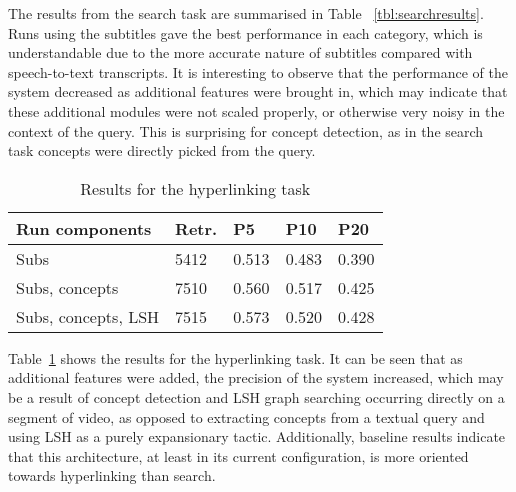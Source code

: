 \documentclass{../acm_proc_article-me11_tweaked}
\begin{document}
The results from the search task are summarised in Table~
\ref{tbl:searchresults}. Runs using the subtitles gave the best performance in 
each category, which is understandable due to the more accurate nature of 
subtitles compared with speech-to-text transcripts. It is interesting to 
observe that the performance of the system decreased as additional features 
were brought in, which may indicate that these additional modules were not 
scaled properly, or otherwise very noisy in the context of the query. This is 
surprising for concept detection, as in the search task concepts were directly 
picked from the query.

\begin{table}
\centering
\caption{Results for the hyperlinking task}
\label{tbl:hyperresults}
\begin{tabular}{|l|l|l|l|l|}
\hline
\textbf{Run components} & \textbf{Retr.} & \textbf{P5} & \textbf{P10} &
\textbf{P20} \\
\hline
Subs & 5412 & 0.513 & 0.483 & 0.390 \\
Subs, concepts & 7510 & 0.560 & 0.517 & 0.425 \\
Subs, concepts, LSH & 7515 & 0.573 & 0.520 & 0.428 \\
\hline
\end{tabular}
\end{table}

Table~\ref{tbl:hyperresults} shows the results for the hyperlinking 
task. It can be seen that as additional features were added, the 
precision of the system increased, which may be a result of concept detection 
and LSH graph searching occurring directly on a segment of video, as opposed to 
extracting concepts from a textual query and using LSH as a purely 
expansionary tactic. Additionally, baseline results indicate that this 
architecture, at least in its current configuration, is more oriented towards 
hyperlinking than search.
\end{document}
